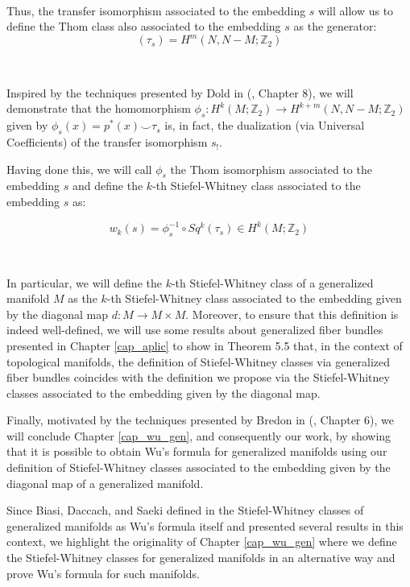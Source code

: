 \documentclass[12pt,oneside]{book}
\newcommand{\Z}{\mathbb{Z}}
\newcommand{\ccup}{\smile}
\begin{document}
    \

    Thus, the transfer isomorphism associated to the embedding $s$ will allow us to define the Thom class 
    also associated to the embedding $s$ as the generator: 
    $$(\tau_{s})=H^{m}(N,N-M;\Z_{2})$$

    \

    Inspired by the techniques presented by Dold in (\cite{dold}, Chapter 8), we will demonstrate that the homomorphism 
    $\phi_{s}:H^{k}(M;\Z_{2})\to H^{k+m}(N,N-M;\Z_{2})$ given by $\phi_{s}(x)=p^{*}(x)\ccup \tau_{s}$ is, in fact, the dualization 
    (via Universal Coefficients) of the transfer isomorphism $s_{!}$.

    Having done this, we will call $\phi_{s}$ the Thom isomorphism associated to the embedding $s$ and 
    define the $k$-th Stiefel-Whitney class associated to the embedding $s$ as:

    $$ w_{k}(s)=\phi_{s}^{-1}\circ Sq^{k}(\tau_{s})\in H^{k}(M;\Z_{2}) $$

    \

    In particular, we will define the $k$-th Stiefel-Whitney class of a generalized manifold $M$ as 
    the $k$-th Stiefel-Whitney class associated to the embedding given by the diagonal map 
    $d:M\to M\times M$. Moreover, to ensure that this definition is indeed well-defined, we will use 
    some results about generalized fiber bundles presented in Chapter \ref{cap_aplic} to show in Theorem 5.5 
    that, in the context of topological manifolds, the definition of Stiefel-Whitney classes via 
    generalized fiber bundles coincides with the definition we propose via the Stiefel-Whitney classes 
    associated to the embedding given by the diagonal map.

    Finally, motivated by the techniques presented by Bredon in (\cite{bredon}, Chapter 6), we will 
    conclude Chapter \ref{cap_wu_gen}, and consequently our work, by showing that it is possible to 
    obtain Wu's formula for generalized manifolds using our definition of Stiefel-Whitney classes 
    associated to the embedding given by the diagonal map of a generalized manifold.

    Since Biasi, Daccach, and Saeki defined in \cite{biasi} the Stiefel-Whitney classes of generalized 
    manifolds as Wu's formula itself and presented several results in this context, we highlight the 
    originality of Chapter \ref{cap_wu_gen} where we define the Stiefel-Whitney classes for generalized 
    manifolds in an alternative way and prove Wu's formula for such manifolds.
\end{document}
